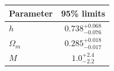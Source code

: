 \begin{tabular} { l  c}

 Parameter &  95\% limits\\
\hline
{\boldmath$h              $} & $0.738^{+0.068}_{-0.076}   $\\

{\boldmath$Ω_m            $} & $0.285^{+0.018}_{-0.017}   $\\

{\boldmath$M              $} & $1.0^{+2.4}_{-2.2}         $\\
\hline
\end{tabular}